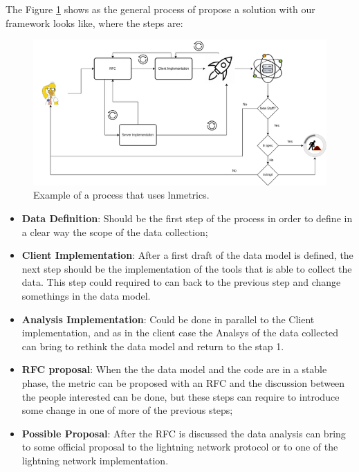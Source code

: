 The Figure \ref{fig:lnmetrics_process} shows as the general process of propose 
a solution with our framework looks like, where the steps are:

\begin{figure}
    \begin{center}
      \includegraphics[scale=0.7]{imgs/lnmetrics-workflow-drawio.png}
    \end{center}
    \caption{Example of a process that uses lnmetrics.}
    \label{fig:lnmetrics_process}
\end{figure}

\begin{itemize}
    \item {\bf Data Definition}: Should be the first step of the process in order
        to define in a clear way the scope of the data collection;
    \item {\bf Client Implementation}: After a first draft of the data model is defined,
        the next step should be the implementation of the tools that is able to collect 
        the data. This step could required to can back to the previous step and change 
        somethings in the data model.
    \item {\bf Analysis Implementation}: Could be done in parallel to the Client implementation,
        and as in the client case the Analsys of the data collected can bring to rethink the data model
        and return to the stap 1.
    \item {\bf RFC proposal}: When the the data model and the code are in a stable phase,
        the metric can be proposed with an RFC and the discussion between the people interested
        can be done, but these steps can require to introduce some change in one of more of the previous steps;
    \item {\bf Possible Proposal}: After the RFC is discussed the data analysis can bring to some 
        official proposal to the lightning network protocol or to one of the lightning network implementation.
\end{itemize}

